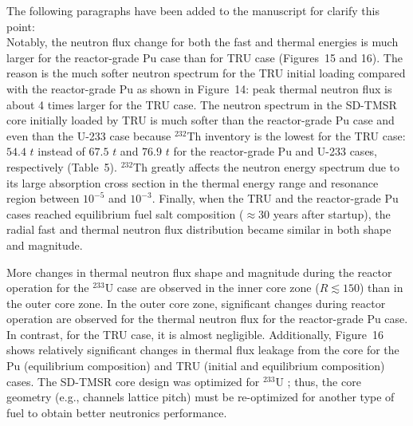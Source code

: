 \documentclass[answers,11pt]{exam}
\begin{document}
\begin{questions}
\begin{solution}
				The following paragraphs have been added to the manuscript for 
				clarify this point:\\
				
				Notably, the neutron flux change for both the fast and thermal 
				energies is much larger for the reactor-grade Pu case than for 
				TRU case (Figures~15 and 16). The reason is the much softer 
				neutron spectrum for the TRU initial loading compared with the 
				reactor-grade Pu as shown in Figure~14: peak thermal neutron 
				flux is about 4 times larger for the TRU case. The neutron 
				spectrum in the SD-TMSR core initially loaded by TRU is much 
				softer than the reactor-grade Pu case and even than the U-233 
				case because $^{232}$Th inventory is the lowest for the TRU 
				case: $54.4$ $t$ instead of $67.5$ $t$ and $76.9$ $t$ for the reactor-grade  
				Pu and U-233 cases, respectively (Table~5). $^{232}$Th greatly 
				affects the neutron energy spectrum due to its large 
				absorption cross section in the thermal energy range and 
				resonance region between $10^{-5}$ and $10^{-3}$. Finally, 
				when the TRU and the reactor-grade Pu cases reached 
				equilibrium fuel salt composition ($\approx 30$ years after 
				startup), the radial fast and thermal neutron flux 
				distribution became similar in both shape and magnitude.
				
				More changes in thermal neutron flux shape and magnitude 
				during the reactor operation for the $^{233}$U case are 
				observed in the inner core zone ($R\lesssim150$) than in the 
				outer core zone. In the outer core zone, significant changes 
				during reactor operation are observed for the thermal 
				neutron flux for the reactor-grade Pu case. In contrast, for 
				the TRU case, it is almost negligible. Additionally, 
				Figure~16 shows relatively significant changes in thermal flux 
				leakage from the core for the Pu (equilibrium composition) and 
				TRU (initial and equilibrium composition) cases. The SD-TMSR 
				core design was optimized for $^{233}$U  				
				\cite{li_optimization_2018}; thus, the core geometry (e.g., 
				channels lattice pitch) must be re-optimized for another type 
				of fuel to obtain better neutronics performance.
        \end{solution}


\end{questions}
\end{document}
